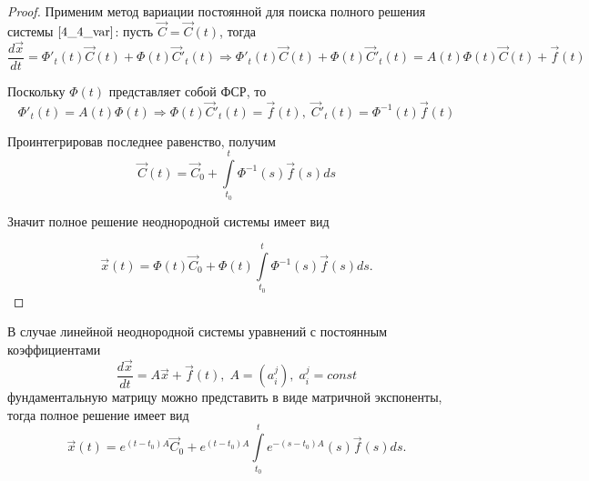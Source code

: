\begin{proof}
    Применим метод вариации постоянной для поиска полного решения системы $\eqref{4_4_var}$: пусть $\overrightarrow C = \overrightarrow C(t)$, тогда
    \begin{equation*}
        \frac{d \overrightarrow x}{dt} = \varPhi'_t (t) \overrightarrow C(t) + \varPhi(t) \overrightarrow C'_t (t) \Rightarrow \varPhi'_t (t) \overrightarrow C(t) + \varPhi (t) \overrightarrow C'_t (t) = A(t) \varPhi(t) \overrightarrow C(t) + \overrightarrow{f}(t)
    \end{equation*}

    Поскольку $\varPhi(t)$ представляет собой ФСР, то 
    \begin{equation*}
        \varPhi'_t (t) = A(t) \varPhi(t) \Rightarrow \varPhi(t) \overrightarrow C'_t (t) = \overrightarrow{f}(t), \; \overrightarrow C'_t (t) = \varPhi^{-1}(t) \overrightarrow{f}(t)
    \end{equation*}

    Проинтегрировав последнее равенство, получим
    \begin{equation*}
        \overrightarrow C(t) = \overrightarrow C_0 + \int \limits_{t_0}^t \varPhi^{-1}(s) \overrightarrow{f}(s) ds
    \end{equation*}

    Значит полное решение неоднородной системы имеет вид

    \begin{equation*}
        \overrightarrow x(t) = \varPhi(t) \overrightarrow C_0 + \varPhi(t) \int \limits_{t_0}^t \varPhi^{-1}(s) \overrightarrow{f}(s) ds.
    \end{equation*}
\end{proof}

\begin{remark}
    В случае линейной неоднородной системы уравнений с постоянным коэффициентами 
    \begin{equation*}
        \frac{d \overrightarrow x}{dt} = A \overrightarrow x + \overrightarrow{f}(t), \; A = (a_i^j), \; a_i^j = const
    \end{equation*}
    фундаментальную матрицу можно представить в виде матричной экспоненты, тогда полное решение имеет вид
    \begin{equation*}
        \overrightarrow x(t) = e^{(t - t_0)A} \overrightarrow C_0 + e^{(t - t_0)A} \int \limits_{t_0}^t e^{-(s - t_0)A}(s) \overrightarrow{f}(s) ds.
    \end{equation*}
\end{remark}


